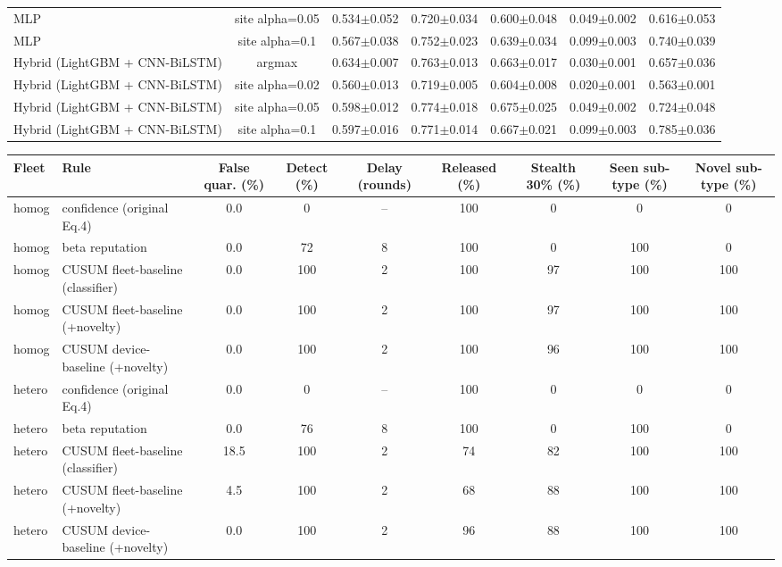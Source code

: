 \begin{tabular}{lcccccc}
MLP & site alpha=0.05 & 0.534$\pm$0.052 & 0.720$\pm$0.034 & 0.600$\pm$0.048 & 0.049$\pm$0.002 & 0.616$\pm$0.053 \\
MLP & site alpha=0.1 & 0.567$\pm$0.038 & 0.752$\pm$0.023 & 0.639$\pm$0.034 & 0.099$\pm$0.003 & 0.740$\pm$0.039 \\
Hybrid (LightGBM + CNN-BiLSTM) & argmax & 0.634$\pm$0.007 & 0.763$\pm$0.013 & 0.663$\pm$0.017 & 0.030$\pm$0.001 & 0.657$\pm$0.036 \\
Hybrid (LightGBM + CNN-BiLSTM) & site alpha=0.02 & 0.560$\pm$0.013 & 0.719$\pm$0.005 & 0.604$\pm$0.008 & 0.020$\pm$0.001 & 0.563$\pm$0.001 \\
Hybrid (LightGBM + CNN-BiLSTM) & site alpha=0.05 & 0.598$\pm$0.012 & 0.774$\pm$0.018 & 0.675$\pm$0.025 & 0.049$\pm$0.002 & 0.724$\pm$0.048 \\
Hybrid (LightGBM + CNN-BiLSTM) & site alpha=0.1 & 0.597$\pm$0.016 & 0.771$\pm$0.014 & 0.667$\pm$0.021 & 0.099$\pm$0.003 & 0.785$\pm$0.036 \\
\bottomrule
\end{tabular}

\begin{tabular}{llccccccc}
\toprule
Fleet & Rule & False quar. (\%) & Detect (\%) & Delay (rounds) & Released (\%) & Stealth 30\% (\%) & Seen sub-type (\%) & Novel sub-type (\%) \\
\midrule
homog & confidence (original Eq.4) & 0.0 & 0 & -- & 100 & 0 & 0 & 0 \\
homog & beta reputation & 0.0 & 72 & 8 & 100 & 0 & 100 & 0 \\
homog & CUSUM fleet-baseline (classifier) & 0.0 & 100 & 2 & 100 & 97 & 100 & 100 \\
homog & CUSUM fleet-baseline (+novelty) & 0.0 & 100 & 2 & 100 & 97 & 100 & 100 \\
homog & CUSUM device-baseline (+novelty) & 0.0 & 100 & 2 & 100 & 96 & 100 & 100 \\
hetero & confidence (original Eq.4) & 0.0 & 0 & -- & 100 & 0 & 0 & 0 \\
hetero & beta reputation & 0.0 & 76 & 8 & 100 & 0 & 100 & 0 \\
hetero & CUSUM fleet-baseline (classifier) & 18.5 & 100 & 2 & 74 & 82 & 100 & 100 \\
hetero & CUSUM fleet-baseline (+novelty) & 4.5 & 100 & 2 & 68 & 88 & 100 & 100 \\
hetero & CUSUM device-baseline (+novelty) & 0.0 & 100 & 2 & 96 & 88 & 100 & 100 \\
\bottomrule
\end{tabular}

